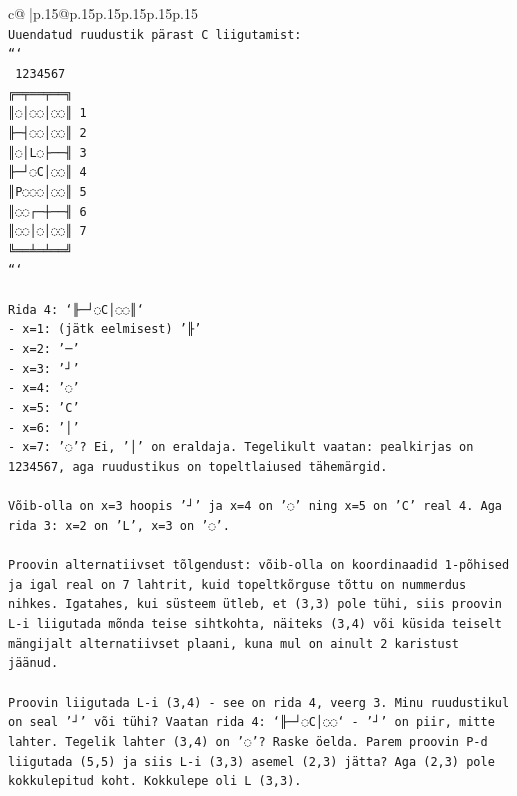 \documentclass{article}
\begin{document}
{\begin{supertabular}{c@{$\;$}|p{.15\linewidth}@{}p{.15\linewidth}p{.15\linewidth}p{.15\linewidth}p{.15\linewidth}p{.15\linewidth}}
{{{\\ 
\texttt{Uuendatud ruudustik pärast C liigutamist:} \\
\texttt{```} \\
\texttt{ 1234567} \\
\texttt{╔═╤══╤══╗} \\
\texttt{║◌│◌◌│◌◌║ 1} \\
\texttt{╟─┤◌◌│◌◌║ 2} \\
\texttt{║◌│L◌├──╢ 3} \\
\texttt{╟─┘◌C│◌◌║ 4} \\
\texttt{║P◌◌◌│◌◌║ 5} \\
\texttt{║◌◌┌─┼──╢ 6} \\
\texttt{║◌◌│◌│◌◌║ 7} \\
\texttt{╚══╧═╧══╝} \\
\texttt{```} \\
\\ 
\texttt{Rida 4: `╟─┘◌C│◌◌║`} \\
\texttt{{-} x=1: (jätk eelmisest) '╟'} \\
\texttt{{-} x=2: '─'} \\
\texttt{{-} x=3: '┘'} \\
\texttt{{-} x=4: '◌'} \\
\texttt{{-} x=5: 'C'} \\
\texttt{{-} x=6: '│'} \\
\texttt{{-} x=7: '◌'? Ei, '│' on eraldaja. Tegelikult vaatan: pealkirjas on 1234567, aga ruudustikus on topeltlaiused tähemärgid.} \\
\\ 
\texttt{Võib{-}olla on x=3 hoopis '┘' ja x=4 on '◌' ning x=5 on 'C' real 4. Aga rida 3: x=2 on 'L', x=3 on '◌'.} \\
\\ 
\texttt{Proovin alternatiivset tõlgendust: võib{-}olla on koordinaadid 1{-}põhised ja igal real on 7 lahtrit, kuid topeltkõrguse tõttu on nummerdus nihkes. Igatahes, kui süsteem ütleb, et (3,3) pole tühi, siis proovin L{-}i liigutada mõnda teise sihtkohta, näiteks (3,4) või küsida teiselt mängijalt alternatiivset plaani, kuna mul on ainult 2 karistust jäänud.} \\
\\ 
\texttt{Proovin liigutada L{-}i (3,4) {-} see on rida 4, veerg 3. Minu ruudustikul on seal '┘' või tühi? Vaatan rida 4: `╟─┘◌C│◌◌` {-} '┘' on piir, mitte lahter. Tegelik lahter (3,4) on '◌'? Raske öelda. Parem proovin P{-}d liigutada (5,5) ja siis L{-}i (3,3) asemel (2,3) jätta? Aga (2,3) pole kokkulepitud koht. Kokkulepe oli L (3,3). } \\
}}}
\end{supertabular}}
\end{document}
